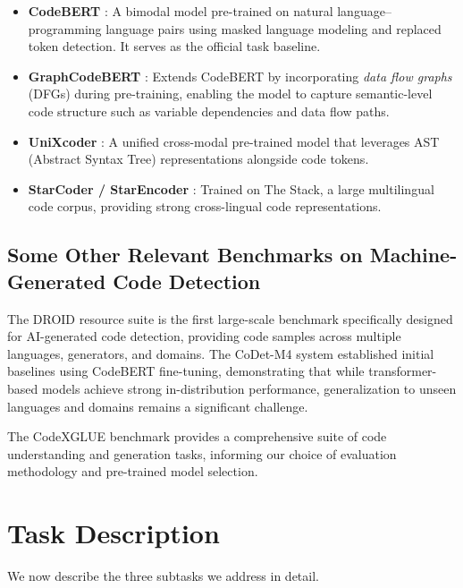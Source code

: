 \documentclass[11pt]{article}
\begin{document}
\begin{itemize}
    \item \textbf{CodeBERT} \cite{feng-etal-2020-codebert}: A bimodal model pre-trained on natural language--programming language pairs using masked language modeling and replaced token detection. It serves as the official task baseline.
    \item \textbf{GraphCodeBERT} \cite{guo2021graphcodebert}: Extends CodeBERT by incorporating \textit{data flow graphs} (DFGs) during pre-training, enabling the model to capture semantic-level code structure such as variable dependencies and data flow paths.
    \item \textbf{UniXcoder} \cite{guo2022unixcoder}: A unified cross-modal pre-trained model that leverages AST (Abstract Syntax Tree) representations alongside code tokens.
    \item \textbf{StarCoder / StarEncoder} \cite{li2023starcoder}: Trained on The Stack, a large multilingual code corpus, providing strong cross-lingual code representations.
\end{itemize}

\subsection{Some Other Relevant Benchmarks on Machine-Generated Code Detection}

The DROID resource suite \cite{orel2025droid} is the first large-scale benchmark specifically designed for AI-generated code detection, providing code samples across multiple languages, generators, and domains. The CoDet-M4 system \cite{orel-etal-2025-codet} established initial baselines using CodeBERT fine-tuning, demonstrating that while transformer-based models achieve strong in-distribution performance, generalization to unseen languages and domains remains a significant challenge.

The CodeXGLUE benchmark \cite{lu2021codexglue} provides a comprehensive suite of code understanding and generation tasks, informing our choice of evaluation methodology and pre-trained model selection.

\section{Task Description}
\label{sec:task}

We now describe the three subtasks we address in detail.
\end{document}

